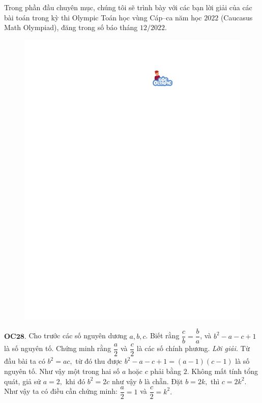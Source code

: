 \begin{multicols}{2}
	Trong phần đầu chuyên mục, chúng tôi sẽ trình bày với các bạn lời giải của các bài toán trong kỳ thi Olympic Toán học vùng Cáp--ca năm học $2022$ (Caucasus Math Olympiad), đăng trong số báo tháng $12/2022$. 
	\begin{figure}[H]
		\vspace*{-5pt}
		\centering
		\captionsetup{labelformat= empty, justification=centering}
		\includegraphics[width= 1\linewidth]{gocolympic}
		\vspace*{-10pt}
	\end{figure}
	{\bf\color{cackithi} OC$\pmb{28.}$} Cho trước các số nguyên dương $a, b, c$. Biết rằng $\dfrac{c}{b} = \dfrac{b}{a}$, và $b^2 - a - c + 1$ là số nguyên tố. Chứng minh rằng $\dfrac{a}{2}$ và $\dfrac{c}{2}$ là các số chính phương.
	\vskip 0.1cm
	\textit{Lời giải.} Từ đầu bài ta có $b^2=ac,$ từ đó thu được  $b^2 - a - c + 1=(a-1)(c-1)$ là số nguyên tố. Như vậy một trong hai số $a$ hoặc $c$ phải bằng $2$. Không mất tính tổng quát, giả sử $a=2,$ khi đó $b^2=2c$ như vậy $b$ là chẵn. Đặt $b=2k,$ thì $c=2k^2.$ Như vậy ta có điều cần chứng minh: $\dfrac{a}{2}=1$ và $\dfrac{c}{2}=k^2.$

\end{multicols}
